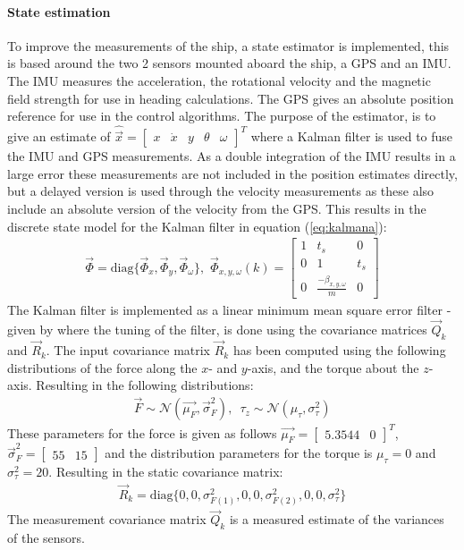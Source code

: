 \documentclass[a0,portrait]{a0poster}
\begin{document}
\begin{center}
{\paragraph{State estimation}
To improve the measurements of the ship, a state estimator is implemented, this is based around the two 2 sensors mounted aboard the ship, a GPS and an IMU. The IMU measures the acceleration, the rotational velocity and the magnetic field strength for use in heading calculations. The GPS gives an absolute position reference for use in the control algorithms. The purpose of the estimator, is to give an estimate of $\hat{\vec{x}} = \begin{bmatrix}x & \dot{x} & y & \theta & \omega\end{bmatrix}^T$ where a Kalman filter is used to fuse the IMU and GPS measurements. As a double integration of the IMU results in a large error these measurements are not included in the position estimates directly, but a delayed version is used through the velocity measurements as these also include an absolute version of the velocity from the GPS. This results in the discrete state model for the Kalman filter in equation (\ref{eq:kalmana}):
\begin{align}
\vec{\Phi} = \text{diag}\{\vec{\Phi} _x,\vec{\Phi} _y,\vec{\Phi} _\omega\},\,\, \vec{\Phi}_{x,y,\omega}(k) = \begin{bmatrix}
1 & t_s & 0\\
0 & 1 & t_s\\
0 & \frac{-\beta_{x,y,\omega}}{m} & 0
\end{bmatrix}
\label{eq:kalmana}
\end{align}
The Kalman filter is implemented as a linear minimum mean square error filter - given by \cite{grewal} where the tuning of the filter, is done using the covariance matrices $\vec{Q}_k$ and $\vec{R}_k$. The input covariance matrix $\vec{R}_k$ has been computed using the following distributions of the force along the $x$- and $y$-axis, and the torque about the $z$-axis. Resulting in the following distributions:
\begin{align}
\vec{F} \sim \mathcal{N}(\vec{\mu_F},\vec{\sigma}^2_F),\,\,\, \tau_z \sim \mathcal{N}(\mu_{\tau},\sigma^2_{\tau})
\end{align}
These parameters for the force is given as follows $\vec{\mu_F} = \begin{bmatrix}5.3544 & 0\end{bmatrix}^T$, $\vec{\sigma}^2_F = \begin{bmatrix}55 & 15\end{bmatrix}$ and the distribution parameters for the torque is $\mu_{\tau} = 0$ and $\sigma^2_{\tau} = 20$. Resulting in the static covariance matrix:
\begin{align}
\vec{R}_k = \text{diag}\{0,0,\sigma^2_{F(1)},0,0,\sigma^2_{F(2)},0,0,\sigma^2_\tau\}
\end{align}
The measurement covariance matrix $\vec{Q}_k$ is a measured estimate of the variances of the sensors.
}
\col{
}
\end{center}
\end{document}
